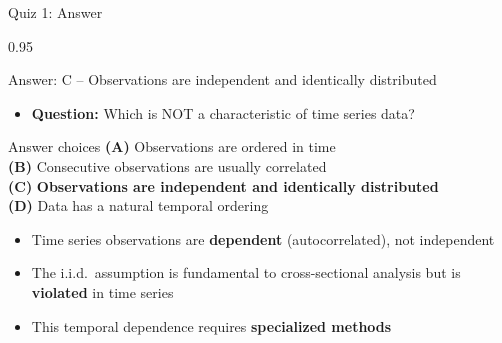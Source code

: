\documentclass[9pt, aspectratio=169, t]{beamer}
\begin{document}
\begin{frame}{Quiz 1: Answer}
    \begin{cminipage}{0.95\textwidth}
    \begin{exampleblock}{Answer: C -- Observations are independent and identically distributed}
        \begin{itemize}\setlength{\itemsep}{0pt}
            \item \textbf{Question:} Which is NOT a characteristic of time series data?
        \end{itemize}

        \vspace{0.3cm}

    \begin{block}{Answer choices}
        \textcolor{MainBlue}{\textbf{(A)}} Observations are ordered in time \incorrect\\[3pt]
        \textcolor{MainBlue}{\textbf{(B)}} Consecutive observations are usually correlated \incorrect\\[3pt]
        \textcolor{MainBlue}{\textbf{(C)}} \textbf{\textcolor{Forest}{Observations are independent and identically distributed}} \correct\\[3pt]
        \textcolor{MainBlue}{\textbf{(D)}} Data has a natural temporal ordering \incorrect
    \end{block}

        \vspace{0.3cm}

        \begin{itemize}
            \item Time series observations are \textbf{dependent} (autocorrelated), not independent
            \item The i.i.d.\ assumption is fundamental to cross-sectional analysis but is \textbf{violated} in time series
            \item This temporal dependence requires \textbf{specialized methods}
        \end{itemize}
    \end{exampleblock}

    \end{cminipage}
\end{frame}
\end{document}
